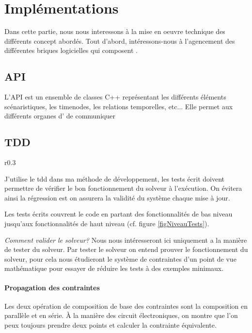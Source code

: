 \chapter{Implémentations}
Dans cette partie, nous nous interessons à la mise en oeuvre technique des différents concept abordés. Tout d'abord, intéressons-nous à l'agencement des différentes briques logicielles qui composent \iscore{}.


\section{API \ossia{}}
L'API \ossia{} est un ensemble de classes C++ représentant les différents éléments scénaristiques, les timenodes, les relations temporelles, etc... Elle permet aux différents organes d'\iscore{} de communiquer

\section{TDD}

\begin{wrapfigure}{r}{0.3\textwidth}
    \centering
    \caption{ Les différents niveaux des composants de l'application.\label{figNiveauTests}}
\end{wrapfigure}

J'utilise le \acrfull{tdd} dans ma méthode de développement, les tests écrit doivent permettre de vérifier le bon fonctionnement du solveur à l'exécution. On évitera ainsi la régression est on assurera la validité du système chaque mise à jour.

Les tests écrits couvrent le code en partant des fonctionnalités de bas niveau jusqu'aux fonctionnalités de haut niveau (cf. figure \ref{figNiveauTests}).

\emph{Comment valider le solveur?}
Nous nous intéresseront ici uniquement a la manière de tester du solveur. Par tester le solveur on entend prouver le fonctionnement du solveur, pour cela nous étudieront le système de contraintes d'un point de vue mathématique pour essayer de réduire les tests à des exemples minimaux.

\subsubsection{Propagation des contraintes}
Les deux opération de composition de base des contraintes sont la composition en parallèle et en série. À la manière des circuit électroniques, on montre que l'on peux toujours prendre deux points et calculer la contrainte équivalente.

